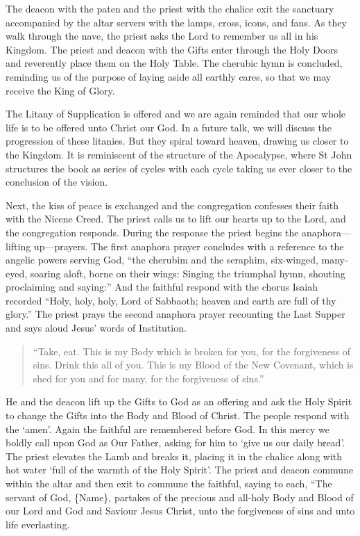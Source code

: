 \documentclass[
]{article}
\begin{document}
The deacon with the paten and the priest with the chalice exit the
sanctuary accompanied by the altar servers with the lamps, cross, icons,
and fans. As they walk through the nave, the priest asks the Lord to
remember us all in his Kingdom. The priest and deacon with the Gifts
enter through the Holy Doors and reverently place them on the Holy
Table. The cherubic hymn is concluded, reminding us of the purpose of
laying aside all earthly cares, so that we may receive the King of
Glory.

The Litany of Supplication is offered and we are again reminded that our
whole life is to be offered unto Christ our God. In a future talk, we
will discuss the progression of these litanies. But they spiral toward
heaven, drawing us closer to the Kingdom. It is reminiscent of the
structure of the Apocalypse, where St John structures the book as series
of cycles with each cycle taking us ever closer to the conclusion of the
vision.

Next, the kiss of peace is exchanged and the congregation confesses
their faith with the Nicene Creed. The priest calls us to lift our
hearts up to the Lord, and the congregation responds. During the
response the priest begins the anaphora---lifting up---prayers. The
first anaphora prayer concludes with a reference to the angelic powers
serving God, ``the cherubim and the seraphim, six-winged, many-eyed,
soaring aloft, borne on their wings: Singing the triumphal hymn,
shouting proclaiming and saying:'' And the faithful respond with the
chorus Isaiah recorded ``Holy, holy, holy, Lord of Sabbaoth; heaven and
earth are full of thy glory.'' The priest prays the second anaphora
prayer recounting the Last Supper and says aloud Jesus' words of
Institution.

\begin{quote}
``Take, eat. This is my Body which is broken for you, for the
forgiveness of sins. Drink this all of you. This is my Blood of the New
Covenant, which is shed for you and for many, for the forgiveness of
sins.''
\end{quote}

He and the deacon lift up the Gifts to God as an offering and ask the
Holy Spirit to change the Gifts into the Body and Blood of Christ. The
people respond with the `amen'. Again the faithful are remembered before
God. In this mercy we boldly call upon God as Our Father, asking for him
to `give us our daily bread'. The priest elevates the Lamb and breaks
it, placing it in the chalice along with hot water `full of the warmth
of the Holy Spirit'. The priest and deacon commune within the altar and
then exit to commune the faithful, saying to each, ``The servant of God,
\{Name\}, partakes of the precious and all-holy Body and Blood of our
Lord and God and Saviour Jesus Christ, unto the forgiveness of sins and
unto life everlasting.
\end{document}
